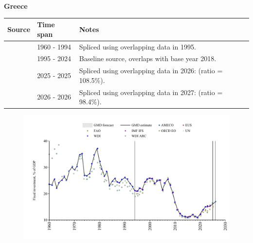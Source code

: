 \documentclass[12pt,a4paper,landscape]{article}
\begin{document}
\begin{adjustbox}{max totalsize={\paperwidth}{\paperheight},center}
\begin{minipage}[t][\textheight][t]{\textwidth}
\vspace*{0.5cm}
{}
\begin{center}
{\Large\bfseries Greece}
\end{center}
\vspace{0.5cm}
\begin{table}[H]
\centering
\small
\begin{tabular}{|l|l|l|}
\hline
\textbf{Source} & \textbf{Time span} & \textbf{Notes} \\
\hline
\rowcolor{white}\cite{WDI}& 1960 - 1994 &Spliced using overlapping data in 1995.\\
\rowcolor{lightgray}\cite{EUS}& 1995 - 2024 &Baseline source, overlaps with base year 2018.\\
\rowcolor{white}\cite{OECD_EO}& 2025 - 2025 &Spliced using overlapping data in 2026: (ratio = 108.5\%).\\
\rowcolor{lightgray}\cite{AMECO}& 2026 - 2026 &Spliced using overlapping data in 2027: (ratio = 98.4\%).\\
\hline
\end{tabular}
\end{table}
\begin{figure}[H]
\centering
\includegraphics[width=\textwidth,height=0.6\textheight,keepaspectratio]{graphs/GRC_finv_GDP.pdf}
\end{figure}
\end{minipage}
\end{adjustbox}
\end{document}
